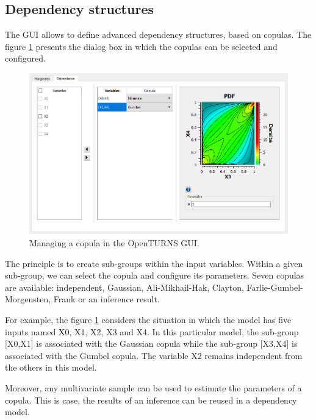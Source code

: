 \documentclass{article}
\begin{document}

\subsection{Dependency structures}

The GUI allows to define advanced dependency structures, based on copulas. 
The figure \ref{fig-copula} presents the dialog box in which the copulas can be selected and 
configured. 

\begin{figure}
\centering
\includegraphics[width=\textwidth]{figures/capture-otgui-copule-focus.png}
\caption{Managing a copula in the OpenTURNS GUI.}
\label{fig-copula}
\end{figure}

The principle is to create sub-groups within the input variables. 
Within a given sub-group, we can select the copula and configure its parameters. 
Seven copulas are available: independent, Gaussian, Ali-Mikhail-Hak, Clayton, 
Farlie-Gumbel-Morgensten, Frank or an inference result.  

For example, the figure \ref{fig-copula} considers the situation in which the model has 
five inputs named X0, X1, X2, X3 and X4. 
In this particular model, the sub-group [X0,X1] is associated with the Gaussian copula while the 
sub-group [X3,X4] is associated with the Gumbel copula. 
The variable X2 remains independent from the others in this model. 

Moreover, any multivariate sample can be used to estimate the parameters of a 
copula. 
This is case, the results of an inference can be reused in a dependency model. 

\end{document}
